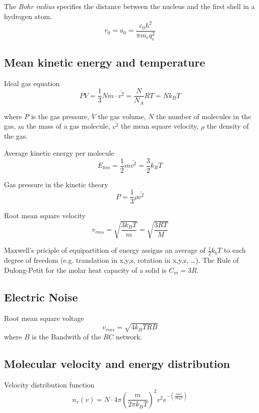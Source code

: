 
The \emph{Bohr radius} specifies the distance between the nucleus and the first shell in a hydrogen atom.
\begin{equation}
	r_0 = a_0 = \frac{\varepsilon_0 h^2}{\pi m_e q_e^2}
\end{equation}

\subsection{Mean kinetic energy and temperature}
Ideal gas equation
\begin{equation}
	PV = \frac{1}{3} Nm \cdot \bar{v^2} = \frac{N}{N_A}RT = N k_B T
\end{equation}

where $P$ is the gas pressure, $V$ the gas volume, $N$ the number of molecules in the gas,
$m$ the mass of a gas molecule, $\bar{v^2}$ the mean square velocity, $\rho$ the density of the gas.

Average kinetic energy per molecule
\begin{equation}
	E_{kin} = \frac{1}{2} m \bar{v^2} = \frac{3}{2} k_B T
\end{equation}

Gas pressure in the kinetic theory
\begin{equation}
	P = \frac{1}{3} \rho \bar{v^2}
\end{equation}

Root mean square velocity
\begin{equation}
	v_{rms} = \sqrt{\frac{3 k_B T}{m}} = \sqrt{\frac{3RT}{M}}
\end{equation}

Maxwell's priciple of equipartition of energy assigns an average of $\frac{1}{2}k_b T$ to 
each degree of freedom (e.g. translation in x,y,z, rotation in x,y,z, \ldots).
The Rule of Dulong-Petit for the molar heat capacity of a solid is $C_m = 3R$.


\subsection{Electric Noise}
Root mean square voltage
\begin{equation}
	v_{rms}  = \sqrt{4 k_B T R B}
\end{equation}
where $B$ is the Bandwith of the $RC$ network.

\subsection{Molecular velocity and energy distribution}
Velocity distribution function
\begin{equation}
	n_v(v) = N \cdot 4 \pi \left(\frac{m}{2\pi k_B T}\right)^2 v^2 e^{-\left(\frac{m v^2}{2 k_B T}\right)}
\end{equation}

